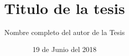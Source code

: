 \documentclass[11pt,openright,final]{unsa}
\title{Titulo de la tesis}
\author{Nombre completo del autor de la Tesis}%
\date{19 de Junio del 2018}
\begin{document}
\makeFirstCover \makeSecondCover %
\begin{frontmatter}

\approved{\cuatro}%

\dedicatory
\begin{singlespace}
\tableofcontents \listoffigures \listoftables \pagebreak
\end{singlespace}
%
%
%
\end{frontmatter}%
\pagestyle{fancyplain}





\begin{singlespace}
\end{singlespace}
\end{document}

